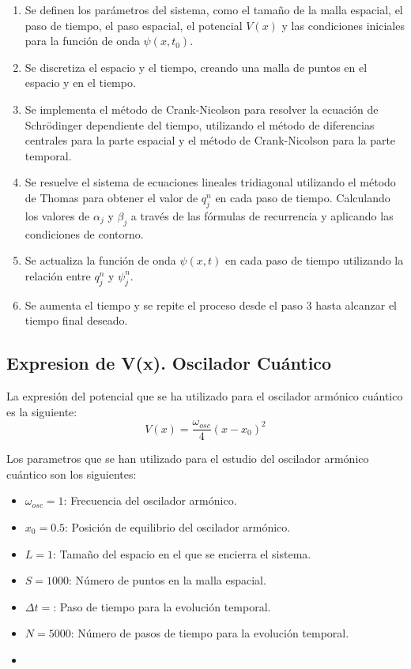 \documentclass[10pt,onecolumn]{article}
\begin{document}
\begin{enumerate}
    \item Se definen los parámetros del sistema, como el tamaño de la malla espacial, el paso de tiempo, el paso espacial, el potencial $V(x)$ y las condiciones iniciales para la función de onda $\psi(x,t_0)$.
    \item Se discretiza el espacio y el tiempo, creando una malla de puntos en el espacio y en el tiempo.
    \item Se implementa el método de Crank-Nicolson para resolver la ecuación de Schrödinger dependiente del tiempo, utilizando el método de diferencias centrales para la parte espacial y el método de Crank-Nicolson para la parte temporal.
    \item Se resuelve el sistema de ecuaciones lineales tridiagonal utilizando el método de Thomas para obtener el valor de $q^n_j$ en cada paso de tiempo. Calculando los valores de $\alpha_j$ y $\beta_j$ a través de las fórmulas de recurrencia y aplicando las condiciones de contorno.
    \item Se actualiza la función de onda $\psi(x,t)$ en cada paso de tiempo utilizando la relación entre $q^n_j$ y $\psi^n_j$.
    \item Se aumenta el tiempo y se repite el proceso desde el paso 3 hasta alcanzar el tiempo final deseado.
\end{enumerate}


\subsection{Expresion de V(x). Oscilador Cuántico}
La expresión del potencial que se ha utilizado para el oscilador armónico cuántico es la siguiente:
\begin{equation}\label{eq:Vx}
    V(x) = \dfrac{\omega_{osc}}{4} (x-x_0)^2
\end{equation}

Los parametros que se han utilizado para el estudio del oscilador armónico cuántico son los siguientes:
\begin{itemize}
    \item $\omega_{osc} = 1$: Frecuencia del oscilador armónico.
    \item $x_0 = 0.5$: Posición de equilibrio del oscilador armónico.
    \item $L = 1$: Tamaño del espacio en el que se encierra el sistema.
    \item $S = 1000$: Número de puntos en la malla espacial.
    \item $\Delta t = $: Paso de tiempo para la evolución temporal.
    \item $N = 5000$: Número de pasos de tiempo para la evolución temporal.
    \item 
\end{itemize}
\end{document}
